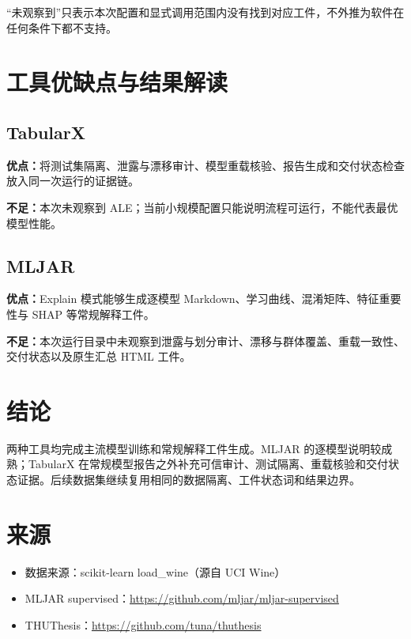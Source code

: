 \documentclass[degree=bachelor,language=chinese,fontset=fandol]{thuthesis}
\begin{document}
“未观察到”只表示本次配置和显式调用范围内没有找到对应工件，不外推为软件在任何条件下都不支持。

\chapter{工具优缺点与结果解读}
\section{TabularX}
\textbf{优点：}将测试集隔离、泄露与漂移审计、模型重载核验、报告生成和交付状态检查放入同一次运行的证据链。

\textbf{不足：}本次未观察到 ALE；当前小规模配置只能说明流程可运行，不能代表最优模型性能。

\section{MLJAR}
\textbf{优点：}Explain 模式能够生成逐模型 Markdown、学习曲线、混淆矩阵、特征重要性与 SHAP 等常规解释工件。

\textbf{不足：}本次运行目录中未观察到泄露与划分审计、漂移与群体覆盖、重载一致性、交付状态以及原生汇总 HTML 工件。

\chapter{结论}
两种工具均完成主流模型训练和常规解释工件生成。MLJAR 的逐模型说明较成熟；TabularX 在常规模型报告之外补充可信审计、测试隔离、重载核验和交付状态证据。后续数据集继续复用相同的数据隔离、工件状态词和结果边界。

\backmatter
\chapter{来源}
\begin{itemize}
  \item 数据来源：scikit-learn load\_wine（源自 UCI Wine）
  \item MLJAR supervised：\url{https://github.com/mljar/mljar-supervised}
  \item THUThesis：\url{https://github.com/tuna/thuthesis}
\end{itemize}
\end{document}
